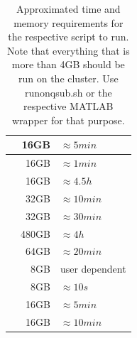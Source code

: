 \documentclass[12pt,a4paper]{scrartcl}
\begin{document}
\begin{table}[h]
\begin{tabular}{l | r | l}
  \nameref{sh:getLyrW} & 16GB & $\approx 5min$ \\\hline
  \nameref{sh:msklbl} & 16GB & $\approx 1min$ \\\hline
  \nameref{sh:prepcoreg} & 16GB & $\approx 4.5h$ \\\hline
  \nameref{sh:prepfct} & 32GB & $\approx 10min$ \\\hline
  \nameref{sh:realign} & 32GB & $\approx 30min$ \\\hline
  \nameref{sh:splitanalyzePRF} & 480GB & $\approx 4h$ \\\hline
  \nameref{sh:tseriesinterp} & 64GB & $\approx 20min$ \\\hline
  \nameref{sh:GUI2ROI} & 8GB & user dependent \\\hline
  \nameref{sh:lbl2msk} & 8GB & $\approx 10s$ \\\hline
  \nameref{sh:mkOver} & 16GB & $\approx 5min$\\\hline
  \nameref{sh:mkprfO} & 16GB & $\approx 10min$ \\\bottomrule
\end{tabular}
\caption[Approximated time and memory requirements when running on qsub]{Approximated time and memory requirements for the respective script to run. Note that everything that is more than 4GB should be run on the cluster. Use runonqsub.sh or the respective MATLAB wrapper for that purpose.}
\label{tab:hardwarerequirements}
\end{table}
\end{document}
